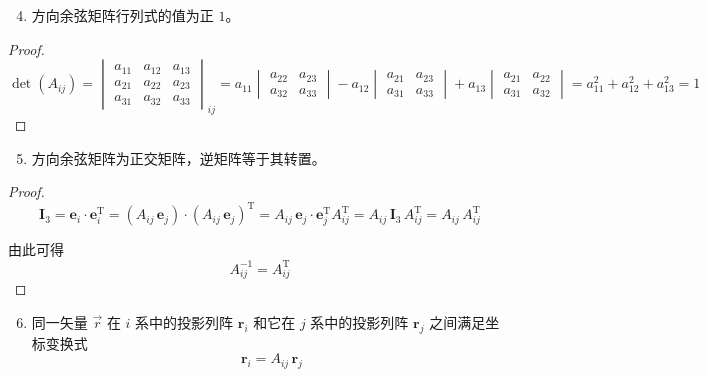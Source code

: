 \begin{enumerate}\setcounter{enumi}{3}
\item 方向余弦矩阵行列式的值为正 $1$。
\end{enumerate}

\begin{proof}
\begin{equation*}
\det(A_{ij}) = \begin{vmatrix} a_{11} & a_{12} & a_{13} \\ a_{21} & a_{22} & a_{23} \\ a_{31} & a_{32} & a_{33} \end{vmatrix}_{\!ij} = a_{11} \begin{vmatrix} a_{22} & a_{23} \\ a_{32} & a_{33} \end{vmatrix} - a_{12} \begin{vmatrix} a_{21} & a_{23} \\ a_{31} & a_{33} \end{vmatrix} + a_{13} \begin{vmatrix} a_{21} & a_{22} \\ a_{31} & a_{32} \end{vmatrix} = a_{11}^2 + a_{12}^2 + a_{13}^2 = 1
\end{equation*}
\end{proof}

\begin{enumerate}\setcounter{enumi}{4}
\item 方向余弦矩阵为正交矩阵，逆矩阵等于其转置。
\end{enumerate}

\begin{proof}
\begin{equation*}
\boldsymbol{I}_3 = \boldsymbol{e}_i \cdot \boldsymbol{e}_i^{\mathrm{T}} = (A_{ij}\, \boldsymbol{e}_j) \cdot (A_{ij}\, \boldsymbol{e}_j)^{\mathrm{T}} = A_{ij}\, \boldsymbol{e}_j \cdot \boldsymbol{e}_j^{\mathrm{T}} A_{ij}^{\mathrm{T}} = A_{ij}\, \boldsymbol{I}_3\, A_{ij}^{\mathrm{T}} = A_{ij}\, A_{ij}^{\mathrm{T}}
\end{equation*}

由此可得
\begin{equation}\label{eq:5.orthogonal}
A_{ij}^{-1} = A_{ij}^{\mathrm{T}}
\end{equation}
\end{proof}

\begin{enumerate}\setcounter{enumi}{5}
\item 同一矢量 $\vec{r}$ 在 $i$ 系中的投影列阵 $\boldsymbol{r}_i$ 和它在 $j$ 系中的投影列阵 $\boldsymbol{r}_j$ 之间满足坐标变换式
\begin{equation}\label{eq:5.coord_transform}
\boldsymbol{r}_i = A_{ij}\, \boldsymbol{r}_j
\end{equation}
\end{enumerate}

